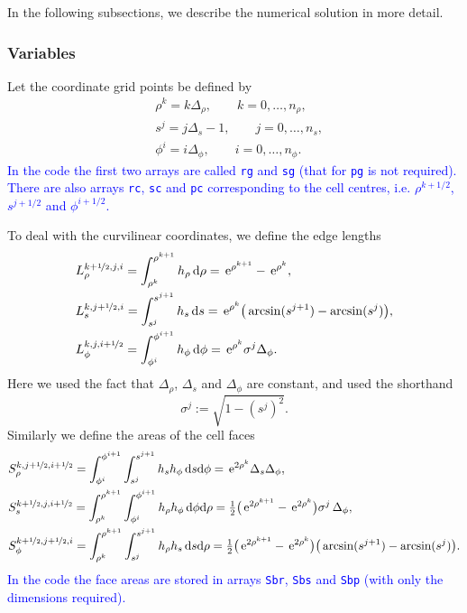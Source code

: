 \documentclass[11pt]{article}
\newcommand{\dr}{\Delta_\rho}
\newcommand{\ds}{\Delta_s}
\newcommand{\dph}{\Delta_\phi}
\newcommand{\half}{\nicefrac{1}{2}}
\newcommand{\ex}{\,\mathrm{e}}
\begin{document}
In the following subsections, we describe the numerical solution in more detail.

\subsubsection{Variables}

Let the coordinate grid points be defined by
\begin{align*}
&\rho^k = k\dr, \qquad k=0,\ldots, n_\rho,\\
&s^j = j\ds - 1, \qquad j=0,\ldots, n_s,\\
&\phi^i = i\dph, \qquad i=0,\ldots, n_\phi.
\end{align*}
\textcolor{blue}{In the code the first two arrays are called \texttt{rg} and \texttt{sg} (that for \texttt{pg} is not required). There are also arrays \texttt{rc},  \texttt{sc} and \texttt{pc} corresponding to the cell centres, i.e. $\rho^{k+1/2}$, $s^{j+1/2}$ and $\phi^{i+1/2}$.}

To deal with the curvilinear coordinates, we define the edge lengths
\begin{align*}
&L_\rho^{k+\half,j,i} = \int_{\rho^k}^{\rho^{k+1}} h_\rho\,\mathrm{d}\rho = \ex^{\rho^{k+1}} - \ex^{\rho^k},\\
&L_s^{k,j+\half,i} = \int_{s^j}^{s^{j+1}} h_s\,\mathrm{d}s = \ex^{\rho^k}\big(\arcsin(s^{j+1}) - \arcsin(s^j)\big),\\
&L_\phi^{k,j,i+\half} = \int_{\phi^i}^{\phi^{i+1}} h_\phi\,\mathrm{d}\phi = \ex^{\rho^k}\sigma^j\dph.
\end{align*}
Here we used the fact that $\dr$, $\ds$ and $\dph$ are constant, and used the shorthand
\[
\sigma^j := \sqrt{1 - (s^j)^2}.
\]
Similarly we define the areas of the cell faces
\begin{align*}
&S_\rho^{k,j+\half,i+\half} =  \int_{\phi^i}^{\phi^{i+1}}\int_{s^j}^{s^{j+1}} h_s h_\phi\,\mathrm{d}s\mathrm{d}\phi = \ex^{2\rho^k}\ds\dph,\\
&S_s^{k+\half,j,i+\half} = \int_{\rho^k}^{\rho^{k+1}}\int_{\phi^i}^{\phi^{i+1}} h_\rho h_\phi\,\mathrm{d}\phi\mathrm{d}\rho = \tfrac12\big(\ex^{2\rho^{k+1}} - \ex^{2\rho^{k}}\big)\sigma^j\,\dph,\\
&S_\phi^{k+\half,j+\half,i} = \int_{\rho^k}^{\rho^{k+1}}\int_{s^j}^{s^{j+1}}h_\rho h_s\,\mathrm{d}s\mathrm{d}\rho = \tfrac12\big(\ex^{2\rho^{k+1}}- \ex^{2\rho^k}\big)\big(\arcsin(s^{j+1}) - \arcsin(s^j)\big).
\end{align*}
\textcolor{blue}{In the code the face areas are stored in arrays \texttt{Sbr}, \texttt{Sbs} and \texttt{Sbp} (with only the dimensions required).}
\end{document}
